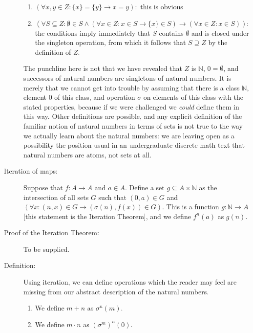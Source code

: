 \documentclass[12pt]{article}
\begin{document}
\begin{description}
\begin{enumerate}
\item $(\forall x,y \in Z:\{x\} = \{y\} \rightarrow x=y):$  this is obvious

\item  $$(\forall S \subseteq Z:\emptyset \in S \wedge (\forall x\in Z:x \in S \rightarrow \{x\} \in S) \rightarrow (\forall x \in Z:x \in S)):$$  the conditions imply immediately
that $S$ contains $\emptyset$ and is closed under the singleton operation, from which it follows that $S \supseteq Z$ by the definition of $Z$.

\end{enumerate}

The punchline here is not that we have revealed that $Z$ is $\mathbb N$, $0 = \emptyset$, and successors of natural numbers are singletons of natural numbers.  It is merely that we cannot get into trouble by assuming that there is a class $\mathbb N$, element 0 of this class, and operation $\sigma$ on elements of this class with the stated properties, because if we were challenged we {\em could\/} define them in this way.  Other definitions are possible, and any explicit definition of the familiar notion of natural numbers in terms of sets is not true to the way we actually learn about the natural numbers:  we are leaving open as a possibility the position usual in an undergraduate discrete math text that natural numbers are atoms, not sets at all.

\item[Iteration of maps:]  Suppose that $f:A \rightarrow A$ and $a \in A$.   Define a set $g \subseteq A \times \mathbb N$ as the intersection of all sets $G$ such that  $(0,a)\in G$
and $(\forall x:(n,x) \in G \rightarrow (\sigma(n),f(x)) \in G)$.  This is a function $g: \mathbb N \rightarrow A$ [this statement is the Iteration Theorem], and we define $f^n(a)$ as $g(n)$.

\item[Proof of the Iteration Theorem:]  To be supplied.

\item[Definition:]  Using iteration, we can define operations which the reader may feel are missing from our abstract description of the natural numbers.

\begin{enumerate}

\item  We define $m+n$ as $\sigma^n(m)$.

\item  We define $m \cdot n$ as $(\sigma^m)^n(0)$.


\end{enumerate}
\end{description}
\end{document}
